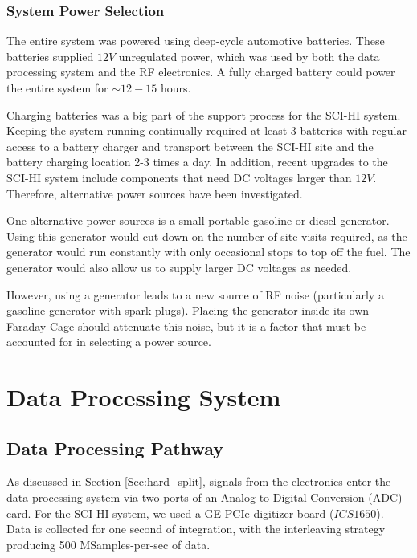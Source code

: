 \subsubsection{System Power Selection} \label{Sec:sys_power}

The entire system was powered using deep-cycle automotive batteries. These batteries supplied $12 V$ unregulated power, which was used by both the data processing system and the RF electronics. A fully charged battery could power the entire system for $\sim12-15$ hours. 

Charging batteries was a big part of the support process for the SCI-HI system. Keeping the system running continually required at least 3 batteries with regular access to a battery charger and transport between the SCI-HI site and the battery charging location 2-3 times a day. In addition, recent upgrades to the SCI-HI system include components that need DC voltages larger than $12V$. Therefore, alternative power sources have been investigated.

One alternative power sources is a small portable gasoline or diesel generator. Using this generator would cut down on the number of site visits required, as the generator would run constantly with only occasional stops to top off the fuel. The generator would also allow us to supply larger DC voltages as needed. 

However, using a generator leads to a new source of RF noise (particularly a gasoline generator with spark plugs). Placing the generator inside its own Faraday Cage should attenuate this noise, but it is a factor that must be accounted for in selecting a power source. 


\section{Data Processing System}


\subsection{Data Processing Pathway}

As discussed in Section \ref{Sec:hard_split}, signals from the electronics enter the data processing system via two ports of an Analog-to-Digital Conversion (ADC) card. For the SCI-HI system, we used a GE PCIe digitizer board ($ICS1650$). Data is collected for one second of integration, with the interleaving strategy producing 500 MSamples-per-sec of data. 

